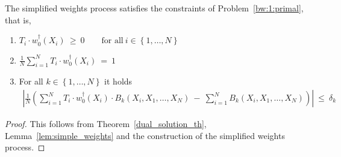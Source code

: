 \begin{theorem}
  \label{th:weights_constr}
  The simplified weights process satisfies the constraints
  of Problem~\ref{bw:1:primal}, that is,
  \begin{enumerate}[label=(\roman*)]
    \item
      $
      T_i\cdot w_0^\dagger(X_i)
      \ 
      \ge
      \ 
      0
      \qquad
      \text{for all}\ 
      i\in  \left\{ 1,\ldots,N \right\}
      $
    \item
      $
      \frac{1}{N}
      \sum_{i=1}^{N} 
      T_i\cdot w_0^\dagger(X_i)
      \ 
      =
      \ 
      1
      $
    \item
      For all $k\in \left\{ 1,\ldots,N \right\}$
      it holds
      \begin{align*}
      \left| 
      \frac{1}{N}
      \left( 
        \sum_{i=1}^{N} 
      T_i\cdot w_0^\dagger(X_i)
      \cdot
        B_k(X_i,X_1,\ldots,X_N)
        \
        -
        \
        \sum_{i=1}^{N} 
        B_k(X_i,X_1,\ldots,X_N)
      \right)
      \right|
      \ 
      \le
      \ 
      \delta_k
      \end{align*}
  \end{enumerate}
\end{theorem}
\begin{proof}
  This follows from Theorem~\ref{dual_solution_th},
  Lemma~\ref{lem:simple_weights}
  and the construction of the simplified weights process.
\end{proof}

